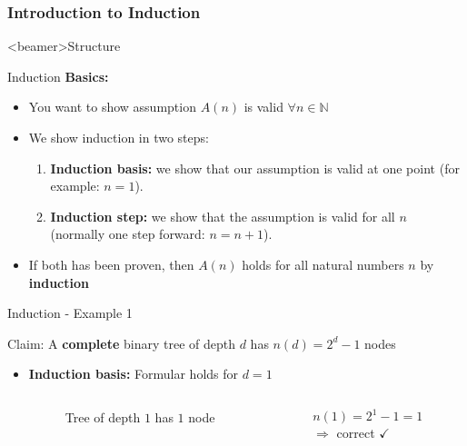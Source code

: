 \subsubsection{Introduction to Induction}

\begin{frame}<beamer>{Structure}
\end{frame}

\begin{frame}{Induction}
  \textbf{Basics:}
  \begin{itemize}
    \item
      You want to show assumption $A(n)$ is valid $\forall n \in \mathbb{N}$
    \item
      We show induction in two steps:
      \begin{enumerate}
        \item
          \textbf{Induction basis:} we show that our assumption is valid 
          at one point (for example: $n = 1$).
        \item
          \textbf{Induction step:} we show that the assumption is valid for 
          all $n$ (normally one step forward: $n = n + 1$).
      \end{enumerate}
    \item
      If both has been proven, then {\color{MainA}$A(n)$} holds for all natural
      numbers {\color{MainA}$n$} by \textbf{induction}
  \end{itemize}
\end{frame}


\begin{frame}{Induction - Example 1}
  \begin{block}{Claim:}
    A \textbf{complete} binary tree of depth $d$ has $n(d) = 2^d - 1$ nodes
  \end{block}
  \begin{itemize}
    \item
      \textbf{Induction basis:} Formular holds for {\color{MainA}$d = 1$}
      \begin{columns}
        \begin{column}{0.5\linewidth}
          \begin{figure}[!h]
            \begin{adjustbox}{width=4em}
              
            \end{adjustbox}
            \caption{Tree of depth {\color{MainA}$1$} has
              {\color{MainA}$1$} node}
          \end{figure}
        \end{column}
        \begin{column}{0.5\linewidth}
          {\color{MainA}$n(1) = 2^1 - 1 = 1$}\\
          $\Rightarrow$ correct $\checkmark$
        \end{column}
      \end{columns}
  \end{itemize}
\end{frame}

